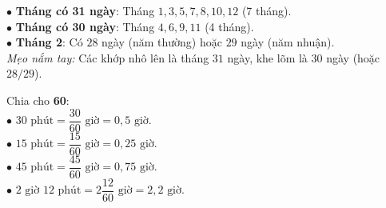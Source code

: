 \documentclass[14pt,a4paper,oneside]{extbook}
\begin{document}
\noindent
\begin{minipage}[t]{0.52\textwidth}
  \begin{tcolorbox}[
    enhanced,
    title={\footnotesize\bfseries\color{white}\faCalendar\ 2. Số ngày trong 12 tháng},
    colback=teal!2!white,
    colframe=teal!75!black,
    arc=2.5mm, boxrule=0.8pt, top=1.8mm, bottom=1.8mm, left=2.2mm, right=2.2mm
  ]
    \footnotesize
    $\bullet$ \textbf{Tháng có 31 ngày}: Tháng $1, 3, 5, 7, 8, 10, 12$ (7 tháng).\\
    $\bullet$ \textbf{Tháng có 30 ngày}: Tháng $4, 6, 9, 11$ (4 tháng).\\
    $\bullet$ \textbf{Tháng 2}: Có $28$ ngày (năm thường) hoặc $29$ ngày (năm nhuận).\\
    \textit{Mẹo nắm tay:} Các khớp nhô lên là tháng $31$ ngày, khe lõm là $30$ ngày (hoặc $28/29$).
  \end{tcolorbox}
\end{minipage}%
\hfill
\begin{minipage}[t]{0.46\textwidth}
  \begin{tcolorbox}[
    enhanced,
    title={\footnotesize\bfseries\color{white}\faExchange\ 3. Đổi thời gian ra số thập phân},
    colback=purple!2!white,
    colframe=purple!70!black,
    arc=2.5mm, boxrule=0.8pt, top=1.8mm, bottom=1.8mm, left=2mm, right=2mm
  ]
    \footnotesize
    Chia cho \textbf{60}:\\
    $\bullet$ $30\text{ phút} = \dfrac{30}{60}\text{ giờ} = 0,5\text{ giờ}$.\\
    $\bullet$ $15\text{ phút} = \dfrac{15}{60}\text{ giờ} = 0,25\text{ giờ}$.\\
    $\bullet$ $45\text{ phút} = \dfrac{45}{60}\text{ giờ} = 0,75\text{ giờ}$.\\
    $\bullet$ $2\text{ giờ } 12\text{ phút} = 2\dfrac{12}{60}\text{ giờ} = 2,2\text{ giờ}$.
  \end{tcolorbox}
\end{minipage}

\vspace{3mm}
\end{document}
